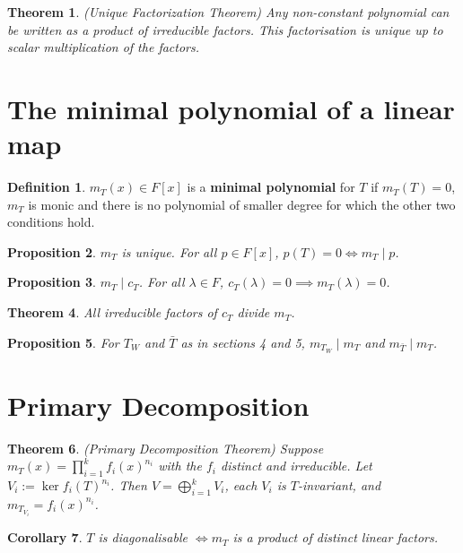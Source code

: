 \documentclass[12pt]{article}
\newtheorem{thm}{Theorem}[section]
\newtheorem{cor}[thm]{Corollary}
\newtheorem{prop}[thm]{Proposition}
\theoremstyle{definition}
\newtheorem*{defn*}{Definition}
\begin{document}
\begin{thm}
	(Unique Factorization Theorem)
	Any non-constant polynomial can be written as a product of irreducible factors.
	This factorisation is unique up to scalar multiplication of the factors.
\end{thm}

\section{The minimal polynomial of a linear map}

\begin{defn*}
	$m_T(x) \in F[x]$ is a \textbf{minimal polynomial} for $T$ if $m_T(T) = 0$, $m_T$ is monic and there is no polynomial of smaller degree for which the other two conditions hold.
\end{defn*}

\begin{prop}
	$m_T$ is unique.
	For all $p \in F[x]$, $p(T) = 0 \iff m_T \mid p$.
\end{prop}

\begin{prop}
	$m_T \mid c_T$.
	For all $\lambda \in F$, $c_T(\lambda) = 0 \implies m_T(\lambda) = 0$.
\end{prop}

\begin{thm}
	All irreducible factors of $c_T$ divide $m_T$.
\end{thm}

\begin{prop}
	For $T_W$ and $\bar{T}$ as in sections 4 and 5, $m_{T_W} \mid m_T$ and $m_{\bar{T}} \mid m_T$.
\end{prop}

\section{Primary Decomposition}

\begin{thm}
	(Primary Decomposition Theorem)
	Suppose $m_T(x) = \prod_{i = 1}^kf_i(x)^{n_i}$ with the $f_i$ distinct and irreducible.
	Let $V_i := \ker{f_i(T)^{n_i}}$.
	Then $V = \bigoplus_{i = 1}^kV_i$, each $V_i$ is $T$-invariant, and $m_{T_{V_i}} = f_i(x)^{n_i}$.
\end{thm}

\begin{cor}
	$T$ is diagonalisable $\iff m_T$ is a product of distinct linear factors.
\end{cor}
\end{document}
